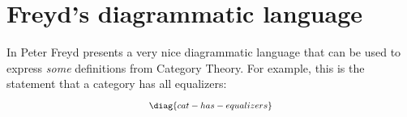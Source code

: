 \documentclass[oneside,12pt]{article}
\begin{document}





%

\section{Freyd's diagrammatic language \DONE}
\label{freyd-notation}

In \cite{Freyd76} Peter Freyd presents a very nice diagrammatic
language that can be used to express {\sl some} definitions from
Category Theory. For example, this is the statement that a category
has all equalizers:
%
%
$$\pu
  \scalebox{0.8}{$
  \diag{cat-has-equalizers}
  $}
$$
\end{document}
